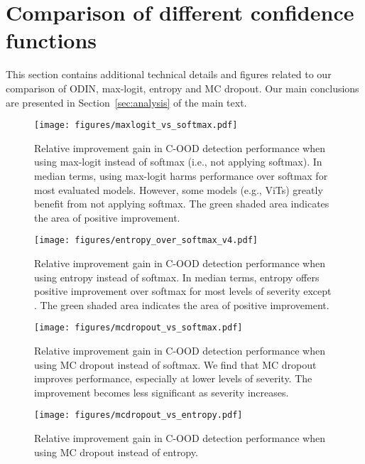 \documentclass[table]{article} \usepackage{PRIMEarxiv}
\begin{document}
\section{Comparison of different confidence functions}
\label{sec:kappa_comparison}
This section contains additional technical details and figures related to our comparison of ODIN, max-logit, entropy and MC dropout. Our main conclusions are presented in Section~\ref{sec:analysis} of the main text.



\begin{figure}[h]
    \centering
    \texttt{[image: figures/maxlogit\_vs\_softmax.pdf]}
    \caption{Relative improvement gain in C-OOD detection performance when using max-logit instead of softmax (i.e., not applying softmax). In median terms, using max-logit harms performance over softmax for most evaluated models. However, some models (e.g., ViTs) greatly benefit from not applying softmax.
    The green shaded area indicates the area of positive improvement.}
    \label{fig:maxlogit_improvement_over_softmax}
\end{figure}

\begin{figure}[h]
    \centering
    \texttt{[image: figures/entropy\_over\_softmax\_v4.pdf]}
    \caption{Relative improvement gain in C-OOD detection performance when using entropy instead of softmax. In median terms, entropy offers positive improvement over softmax for most levels of severity except  .
    The green shaded area indicates the area of positive improvement.}
    \label{fig:entropy_improvement_over_softmax}
\end{figure}

\begin{figure}[h]
    \centering
    \texttt{[image: figures/mcdropout\_vs\_softmax.pdf]}
    \caption{Relative improvement gain in C-OOD detection performance when using MC dropout instead of softmax. We find that MC dropout improves performance, especially at lower levels of severity. The improvement becomes less significant as severity increases.}
    \label{fig:MCdropout_imrovement_over_softmax}
\end{figure}

\begin{figure}[h]
    \centering
    \texttt{[image: figures/mcdropout\_vs\_entropy.pdf]}
    \caption{Relative improvement gain in C-OOD detection performance when using  MC dropout instead of entropy. }
    \label{fig:MCdropout_imrovement_over_entropy}
\end{figure}
\end{document}
